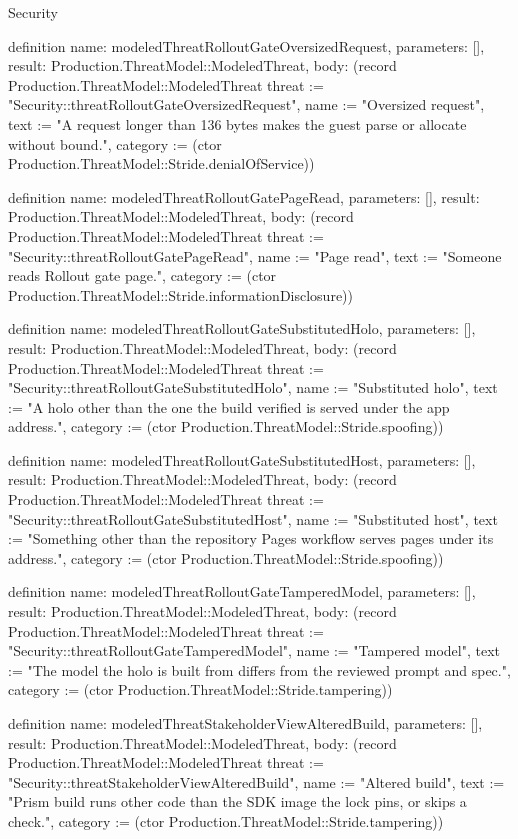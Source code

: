 \begin{lexlean}{Security}
\begin{semanticmodule}
definition{
  name: modeledThreatRolloutGateOversizedRequest,
  parameters: [],
  result: Production.ThreatModel::ModeledThreat,
  body: (record Production.ThreatModel::ModeledThreat {threat := "Security::threatRolloutGateOversizedRequest", name := "Oversized request", text := "A request longer than 136 bytes makes the guest parse or allocate without bound.", category := (ctor Production.ThreatModel::Stride.denialOfService)})
}

definition{
  name: modeledThreatRolloutGatePageRead,
  parameters: [],
  result: Production.ThreatModel::ModeledThreat,
  body: (record Production.ThreatModel::ModeledThreat {threat := "Security::threatRolloutGatePageRead", name := "Page read", text := "Someone reads Rollout gate page.", category := (ctor Production.ThreatModel::Stride.informationDisclosure)})
}

definition{
  name: modeledThreatRolloutGateSubstitutedHolo,
  parameters: [],
  result: Production.ThreatModel::ModeledThreat,
  body: (record Production.ThreatModel::ModeledThreat {threat := "Security::threatRolloutGateSubstitutedHolo", name := "Substituted holo", text := "A holo other than the one the build verified is served under the app address.", category := (ctor Production.ThreatModel::Stride.spoofing)})
}

definition{
  name: modeledThreatRolloutGateSubstitutedHost,
  parameters: [],
  result: Production.ThreatModel::ModeledThreat,
  body: (record Production.ThreatModel::ModeledThreat {threat := "Security::threatRolloutGateSubstitutedHost", name := "Substituted host", text := "Something other than the repository Pages workflow serves pages under its address.", category := (ctor Production.ThreatModel::Stride.spoofing)})
}

definition{
  name: modeledThreatRolloutGateTamperedModel,
  parameters: [],
  result: Production.ThreatModel::ModeledThreat,
  body: (record Production.ThreatModel::ModeledThreat {threat := "Security::threatRolloutGateTamperedModel", name := "Tampered model", text := "The model the holo is built from differs from the reviewed prompt and spec.", category := (ctor Production.ThreatModel::Stride.tampering)})
}

definition{
  name: modeledThreatStakeholderViewAlteredBuild,
  parameters: [],
  result: Production.ThreatModel::ModeledThreat,
  body: (record Production.ThreatModel::ModeledThreat {threat := "Security::threatStakeholderViewAlteredBuild", name := "Altered build", text := "Prism build runs other code than the SDK image the lock pins, or skips a check.", category := (ctor Production.ThreatModel::Stride.tampering)})
}


\end{semanticmodule}
\end{lexlean}
